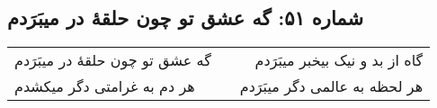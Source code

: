 \begin{center}
\section*{شماره ۵۱: گه عشق تو چون حلقۀ در میبَرَدم}
\label{sec:051}
\begin{longtable}{l p{0.5cm} r}
گه عشق تو چون حلقهٔ در میبَرَدم
&&
گاه از بد و نیک بیخبر میبَرَدم
\\
هر دم به غرامتی دگر میکشدم
&&
هر لحظه به عالمی دگر میبَرَدم
\\
\end{longtable}
\end{center}
